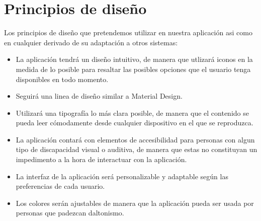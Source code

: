 \section{Principios de diseño}

Los principios de diseño que pretendemos utilizar en nuestra aplicación asi como en cualquier derivado de su adaptación a otros sistemas:

\begin{itemize}
	\item La aplicación tendrá un diseño intuitivo, de manera que utlizará iconos en la medida de lo posible para resaltar las posibles opciones que el usuario tenga disponibles en todo momento.
	\item Seguirá una linea de diseño similar a Material Design.
	\item Utilizará una tipografía lo más clara posible, de manera que el contenido se pueda leer cómodamente desde cualquier dispositivo en el que se reproduzca.
	\item La aplicación contará con elementos de accesibilidad para personas con algun tipo de discapacidad visual o auditiva, de manera que estas no constituyan un impedimento a la hora de interactuar con la aplicación.
	\item La interfaz de la aplicación será personalizable y adaptable según las preferencias de cada usuario.
	\item Los colores serán ajustables de manera que la aplicación pueda ser usada por personas que padezcan daltonismo.
\end{itemize}





















